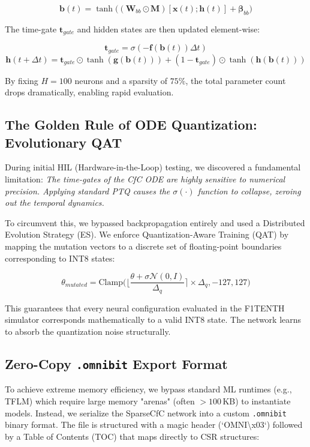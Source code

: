\documentclass[lettersize,journal]{IEEEtran}
\begin{document}
\begin{equation}
    \mathbf{b}(t) = \tanh\big( (\mathbf{W}_{bb} \odot \mathbf{M}) [\mathbf{x}(t) ; \mathbf{h}(t)] + \mathbf{\beta}_{bb} \big)
\end{equation}

The time-gate $\mathbf{t}_{gate}$ and hidden states are then updated element-wise:

\begin{equation}
    \mathbf{t}_{gate} = \sigma(-\mathbf{f}(\mathbf{b}(t)) \Delta t)
\end{equation}
\begin{equation}
    \mathbf{h}(t+\Delta t) = \mathbf{t}_{gate} \odot \tanh(\mathbf{g}(\mathbf{b}(t))) + (1 - \mathbf{t}_{gate}) \odot \tanh(\mathbf{h}(\mathbf{b}(t)))
\end{equation}

By fixing $H = 100$ neurons and a sparsity of $75\%$, the total parameter count drops dramatically, enabling rapid evaluation.

\subsection{The Golden Rule of ODE Quantization: Evolutionary QAT}
During initial HIL (Hardware-in-the-Loop) testing, we discovered a fundamental limitation: \textit{The time-gates of the CfC ODE are highly sensitive to numerical precision. Applying standard PTQ causes the $\sigma(\cdot)$ function to collapse, zeroing out the temporal dynamics.}

To circumvent this, we bypassed backpropagation entirely and used a Distributed Evolution Strategy (ES). We enforce Quantization-Aware Training (QAT) by mapping the mutation vectors to a discrete set of floating-point boundaries corresponding to INT8 states:

\begin{equation}
    \theta_{mutated} = \text{Clamp}\Big( \lfloor \frac{\theta + \sigma \mathcal{N}(0, I)}{\Delta_{q}} \rceil \times \Delta_{q}, -127, 127 \Big)
\end{equation}

This guarantees that every neural configuration evaluated in the F1TENTH simulator corresponds mathematically to a valid INT8 state. The network learns to absorb the quantization noise structurally.

\subsection{Zero-Copy \texttt{.omnibit} Export Format}
To achieve extreme memory efficiency, we bypass standard ML runtimes (e.g., TFLM) which require large memory "arenas" (often $>100$\,KB) to instantiate models. Instead, we serialize the SparseCfC network into a custom \texttt{.omnibit} binary format. The file is structured with a magic header (`OMNI\textbackslash x03`) followed by a Table of Contents (TOC) that maps directly to CSR structures:
\end{document}

